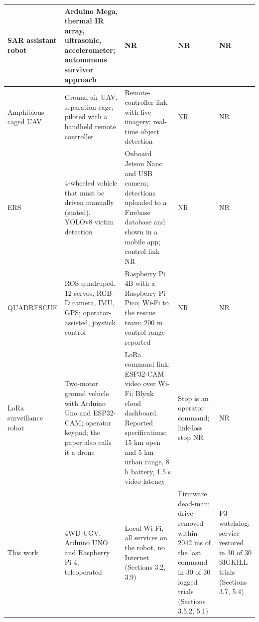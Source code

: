 \begin{center}
\begin{longtable}{|p{2.0cm}|p{3.3cm}|p{3.3cm}|p{2.6cm}|p{2.6cm}|}
\hline
SAR assistant robot \cite{kim2023} & Arduino Mega, thermal IR array, ultrasonic, accelerometer; autonomous survivor approach & NR & NR & NR \\
\hline
Amphibious caged UAV \cite{jia2025} & Ground-air UAV, separation cage; piloted with a handheld remote controller & Remote-controller link with live imagery; real-time object detection & NR & NR \\
\hline
ERS \cite{raghavan2026} & 4-wheeled vehicle that must be driven manually (stated), YOLOv8 victim detection & Onboard Jetson Nano and USB camera; detections uploaded to a Firebase database and shown in a mobile app; control link NR & NR & NR \\
\hline
QUADRESCUE \cite{deshmukh2025} & ROS quadruped, 12 servos, RGB-D camera, IMU, GPS; operator-assisted, joystick control & Raspberry Pi 4B with a Raspberry Pi Pico; Wi-Fi to the rescue team; 200 m control range reported & NR & NR \\
\hline
LoRa surveillance robot \cite{gehlot2025} & Two-motor ground vehicle with Arduino Uno and ESP32-CAM; operator keypad; the paper also calls it a drone & LoRa command link; ESP32-CAM video over Wi-Fi; Blynk cloud dashboard. Reported specifications: 15 km open and 5 km urban range, 8 h battery, 1.5 s video latency & Stop is an operator command; link-loss stop NR & NR \\
\hline
This work & 4WD UGV, Arduino UNO and Raspberry Pi 4; teleoperated & Local Wi-Fi, all services on the robot, no Internet (Sections 3.2, 3.9) & Firmware dead-man; drive removed within 2042 ms of the last command in 30 of 30 logged trials (Sections 3.5.2, 5.1) & P3 watchdog; service restored in 30 of 30 SIGKILL trials (Sections 3.7, 5.4) \\
\hline
\end{longtable}
\end{center}

